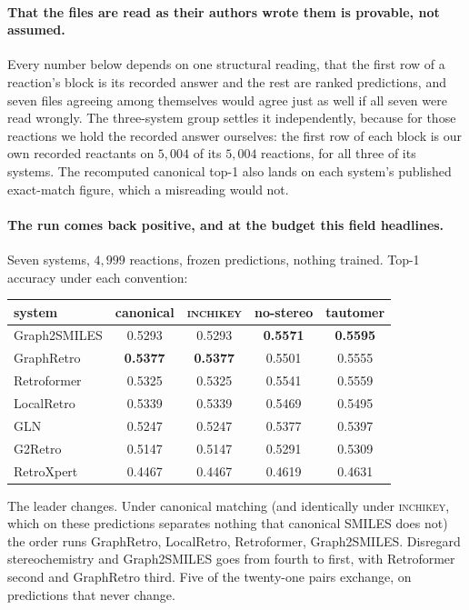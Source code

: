 \paragraph{That the files are read as their authors wrote them is provable, not assumed.} Every
number below depends on one structural reading, that the first row of a reaction's block is its
recorded answer and the rest are ranked predictions, and seven files agreeing among themselves
would agree just as well if all seven were read wrongly. The three-system group settles it
independently, because for those reactions we hold the recorded answer ourselves: the first row of
each block is our own recorded reactants on $5{,}004$ of its $5{,}004$ reactions, for all three of
its systems. The recomputed canonical top-1 also lands on each system's published exact-match figure,
which a misreading would not.

\paragraph{The run comes back positive, and at the budget this field headlines.} Seven systems,
$4{,}999$ reactions, frozen predictions, nothing trained. Top-1 accuracy under each convention:

\begin{center}
\footnotesize
\begin{tabular}{lcccc}
\toprule
system & canonical & \textsc{inchikey} & no-stereo & tautomer \\
\midrule
Graph2SMILES & 0.5293 & 0.5293 & \textbf{0.5571} & \textbf{0.5595} \\
GraphRetro   & \textbf{0.5377} & \textbf{0.5377} & 0.5501 & 0.5555 \\
Retroformer  & 0.5325 & 0.5325 & 0.5541 & 0.5559 \\
LocalRetro   & 0.5339 & 0.5339 & 0.5469 & 0.5495 \\
GLN          & 0.5247 & 0.5247 & 0.5377 & 0.5397 \\
G2Retro      & 0.5147 & 0.5147 & 0.5291 & 0.5309 \\
RetroXpert   & 0.4467 & 0.4467 & 0.4619 & 0.4631 \\
\bottomrule
\end{tabular}
\end{center}

The leader changes. Under canonical matching (and identically under \textsc{inchikey}, which on
these predictions separates nothing that canonical SMILES does not) the order runs GraphRetro,
LocalRetro, Retroformer, Graph2SMILES. Disregard stereochemistry and Graph2SMILES goes from fourth
to first, with Retroformer second and GraphRetro third. Five of the twenty-one pairs exchange, on
predictions that never change.



